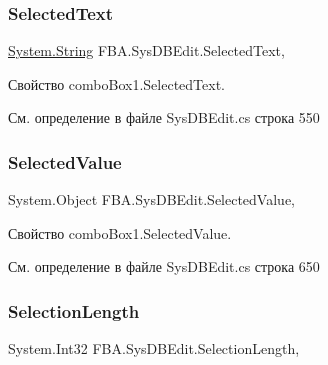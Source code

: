 \subsubsection{\texorpdfstring{Selected\+Text}{SelectedText}}
{\footnotesize\ttfamily \mbox{\hyperlink{namespace_f_b_a_a940b390561ecfbdb6e1606ec1711bd59a27118326006d3829667a400ad23d5d98}{System.\+String}} F\+B\+A.\+Sys\+D\+B\+Edit.\+Selected\+Text\hspace{0.3cm}{\ttfamily [get]}, {\ttfamily [set]}}



Свойство combo\+Box1.\+Selected\+Text. 



См. определение в файле Sys\+D\+B\+Edit.\+cs строка 550

\mbox{\label{class_f_b_a_1_1_sys_d_b_edit_a7cff77343646e851dd70f5351ece5cc4}} 
\subsubsection{\texorpdfstring{Selected\+Value}{SelectedValue}}
{\footnotesize\ttfamily System.\+Object F\+B\+A.\+Sys\+D\+B\+Edit.\+Selected\+Value\hspace{0.3cm}{\ttfamily [get]}, {\ttfamily [set]}}



Свойство combo\+Box1.\+Selected\+Value. 



См. определение в файле Sys\+D\+B\+Edit.\+cs строка 650

\mbox{\label{class_f_b_a_1_1_sys_d_b_edit_a1dc7ba8fb759e70dd56b0c672ba496f4}} 
\subsubsection{\texorpdfstring{Selection\+Length}{SelectionLength}}
{\footnotesize\ttfamily System.\+Int32 F\+B\+A.\+Sys\+D\+B\+Edit.\+Selection\+Length\hspace{0.3cm}{\ttfamily [get]}, {\ttfamily [set]}}



